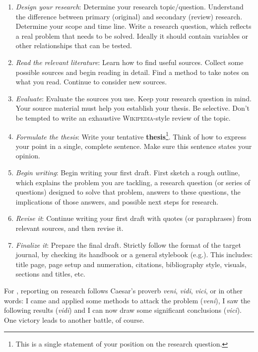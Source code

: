 \documentclass[graybox,envcountchap,sectrefs,UStrade]{svmono}
\begin{document}
\begin{enumerate}
\renewcommand{\labelenumi}{(\textit{\alph{enumi}})}
  \item \emph{Design your research}: Determine your research topic/question. Understand the difference between primary (original) and secondary (review) research. Determine your scope and time line. Write a research question, which reflects a real problem that needs to be solved. Ideally it should contain variables or other relationships that can be tested.
  \item \emph{Read the relevant literature}: Learn how to find useful sources. Collect some possible sources and begin reading in detail. Find a method to take notes on what you read. Continue to consider new sources.
  \item \emph{Evaluate}: Evaluate the sources you use. Keep your research question in mind. Your source material must help you establish your thesis. Be selective. Don't be tempted to write an exhaustive \textsc{Wikipedia}-style review of the topic.
  \item \emph{Formulate the thesis}: Write your tentative \textbf{thesis}\footnote{This is a single statement of your position on the research question.}. Think of how to express your point in a single, complete sentence. Make sure this sentence states your opinion.
  \item \emph{Begin writing}: Begin writing your first draft. First sketch a rough outline, which explains the problem you are tackling, a research question (or series of questions) designed to solve that problem, answers to these questions, the implications of those answers, and possible next steps for research.
  \item \emph{Revise it}: Continue writing your first draft with quotes (or paraphrases) from relevant sources, and then revise it.
  \item \emph{Finalize it}: Prepare the final draft. Strictly follow the format of the target journal, by checking its handbook or a general stylebook (e.g.\@ \citet{turabian2007manual}). This includes: title page, page setup and numeration, citations, bibliography style, visuals, sections and titles, etc.
\end{enumerate}

For \citet{Rossiter2010RCS}, reporting on research follows Caesar's proverb \emph{veni}, \emph{vidi}, \emph{vici}, or in other words: I came and applied some methods to attack the problem (\emph{veni}), I saw the following results (\emph{vidi}) and I can now draw some significant conclusions (\emph{vici}). One victory leads to another battle, of course.\par
\end{document}
